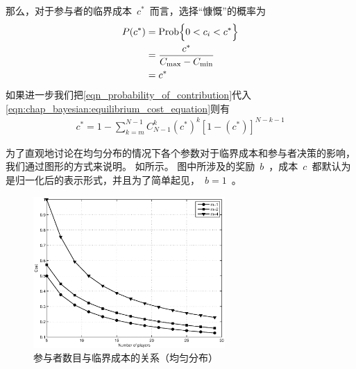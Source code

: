 那么，对于参与者的临界成本~$c^*$~而言，选择“慷慨”的概率为
\begin{align} 
    P(c^*) &= \text{Prob} \Bigl\{ 0 < c_i < c^*\Bigr\} \notag\\ 
    &= \frac{c^*}{C_{\max}-C_{\min}} \notag\\
    &= c^* 
    \label{eqn_probability_of_contribution} 
\end{align}
如果进一步我们把\eqref{eqn_probability_of_contribution}代入\eqref{eqn:chap_bayesian:equilibrium_cost_equation}则有
\begin{align*} 
    c^* = 1- \sum_{k=m}^{N-1}C_{N-1}^k (c^*)^k [1-(c^*)]^{N-k-1}
\end{align*}

为了直观地讨论在均匀分布的情况下各个参数对于临界成本和参与者决策的影响，我们通过图形的方式来说明。
如所示。
图中所涉及的奖励~$b$~，成本~$c$~都默认为是归一化后的表示形式，并且为了简单起见，~$b = 1$~。
\begin{figure}[tb]
\begin{centering}
\includegraphics[width=0.65\textwidth]{bayesian_uniform_user_number_vs_contribute_probability.eps}
\caption{参与者数目与临界成本的关系（均匀分布）}
\label{fig:bayesian_user_numb_vs_contr_prob}
\end{centering}
\end{figure}
